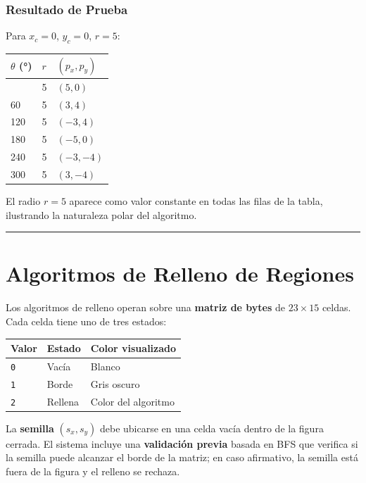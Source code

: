\documentclass[
  spanish,
  a4paper,
  12pt,
]{article}
\newcommand{\passthrough}[1]{#1}
\newcounter{none} %
\begin{document}
\subsubsection{Resultado de Prueba}\label{resultado-de-prueba-5}

Para \(x_c=0\), \(y_c=0\), \(r=5\):

{\def\LTcaptype{none} %
\begin{longtable}[]{@{}lll@{}}
\toprule\noalign{}
\(\theta\) (°) & \(r\) & \((p_x, p_y)\) \\
\midrule\noalign{}
\endhead
\bottomrule\noalign{}
\endlastfoot
0 & 5 & \((5, 0)\) \\
60 & 5 & \((3, 4)\) \\
120 & 5 & \((−3, 4)\) \\
180 & 5 & \((−5, 0)\) \\
240 & 5 & \((−3, −4)\) \\
300 & 5 & \((3, −4)\) \\
\end{longtable}
}

El radio \(r=5\) aparece como valor constante en todas las filas de la
tabla, ilustrando la naturaleza polar del algoritmo.

\begin{center}\rule{0.5\linewidth}{0.5pt}\end{center}

\section{Algoritmos de Relleno de
Regiones}\label{algoritmos-de-relleno-de-regiones}

Los algoritmos de relleno operan sobre una \textbf{matriz de bytes} de
\(23 \times 15\) celdas. Cada celda tiene uno de tres estados:

{\def\LTcaptype{none} %
\begin{longtable}[]{@{}lll@{}}
\toprule\noalign{}
Valor & Estado & Color visualizado \\
\midrule\noalign{}
\endhead
\bottomrule\noalign{}
\endlastfoot
\passthrough{\lstinline!0!} & Vacía & Blanco \\
\passthrough{\lstinline!1!} & Borde & Gris oscuro \\
\passthrough{\lstinline!2!} & Rellena & Color del algoritmo \\
\end{longtable}
}

La \textbf{semilla} \((s_x, s_y)\) debe ubicarse en una celda vacía
dentro de la figura cerrada. El sistema incluye una \textbf{validación
previa} basada en BFS que verifica si la semilla puede alcanzar el borde
de la matriz; en caso afirmativo, la semilla está fuera de la figura y
el relleno se rechaza.
\end{document}
